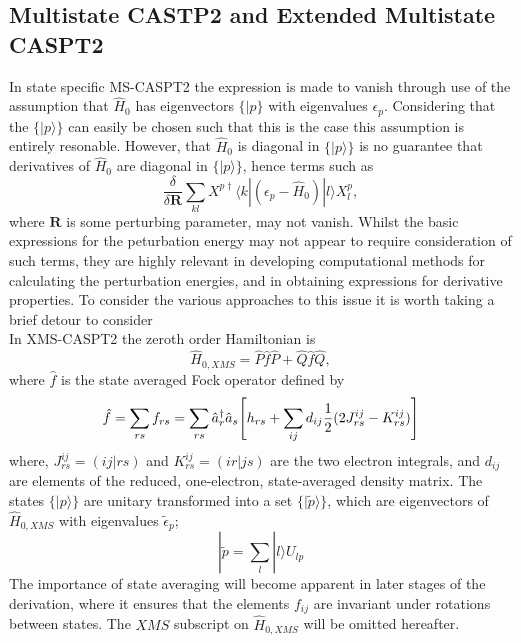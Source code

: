 \documentclass[12pt]{article}
\begin{document}
\subsection{ Multistate CASTP2 and Extended Multistate CASPT2 }
 In state specific MS-CASPT2
the expression is made to vanish through use of the assumption that $\hat{H}_{0}$ has eigenvectors
$\{|p\}$ with eigenvalues $\epsilon_{p}$. Considering that the
$\{|p\rangle\}$ can easily be chosen such that this is the case this assumption is entirely resonable.
However, that $\hat{H}_{0}$ is diagonal in $\{|p\rangle\}$ is no guarantee that derivatives
of $\hat{H}_{0}$ are diagonal in $\{|p\rangle\}$, hence terms such as 
\begin{equation}
\frac{\delta}{\delta \mathbf{R} }\sum_{kl}X^{p\dagger}\langle k | (\epsilon_{p} - \hat{H}_{0}) | l \rangle X_{l}^{p},
\label{eqn:multistate_PT_energy_nondiag_deriv}
\end{equation}
where $\mathbf{R}$ is some perturbing parameter, may not vanish. Whilst the basic expressions
for the peturbation energy may not appear to require consideration of such terms, they are highly relevant
in developing computational methods for calculating the perturbation energies, and in obtaining expressions
for derivative properties. To consider the various approaches to this issue it is worth taking a 
brief detour to consider \\

\noindent In XMS-CASPT2 the zeroth order Hamiltonian is
\begin{equation}
\hat{H}_{0,XMS} = \hat{P}\hat{f}\hat{P} +  \hat{Q}\hat{f}\hat{Q},
\end{equation}
where $\hat{f}$ is the state averaged Fock operator defined by
\begin{equation}
\hat{f} = \sum_{rs}f_{rs} = \sum_{rs}
\hat{a}^{\dagger}_{r}\hat{a}_{s}
\Bigg{[} h_{rs} 
+ \sum_{ij}d_{ij}
\frac{1}{2}( 2J^{ij}_{rs}-K^{ij}_{rs})  \Bigg{]}
\end{equation}
where, $J^{ij}_{rs} = (ij|rs)$ and $K^{ij}_{rs} = (ir|js)$ are the two electron integrals, and $d_{ij}$ are elements of the reduced, one-electron,
state-averaged density matrix. The states $\{|p\rangle\}$ are unitary transformed into a set $\{|\tilde{p}\rangle\}$, 
which are eigenvectors of $\hat{H}_{0,XMS}$ with eigenvalues $\tilde{\epsilon}_{p}$;
\begin{equation}
|\tilde{p} = \sum_{l}|l\rangle U_{lp}
\end{equation}
The importance of state averaging will become apparent in later stages of the derivation, 
where it ensures that the elements $f_{ij}$ are invariant under rotations
between states. The $XMS$ subscript on $\hat{H}_{0,XMS}$ will be omitted hereafter.\\ 
\end{document}

